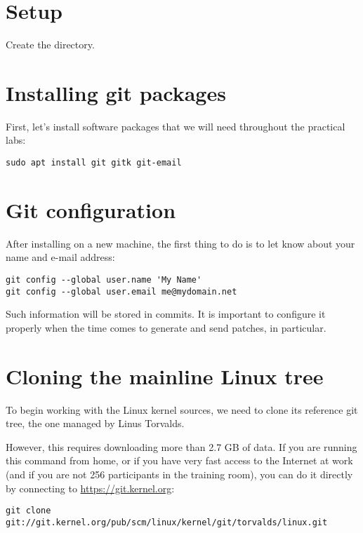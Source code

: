 
\section{Setup}

Create the  directory.

\section{Installing git packages}

First, let's install software packages that we will need
throughout the practical labs:

\begin{verbatim}
sudo apt install git gitk git-email
\end{verbatim}

\section{Git configuration}

After installing  on a new machine, the first thing to do is
to let  know about your name and e-mail address:

\begin{verbatim}
git config --global user.name 'My Name'
git config --global user.email me@mydomain.net
\end{verbatim}

Such information will be stored in commits. It is important
to configure it properly when the time comes to generate and
send patches, in particular.

\section{Cloning the mainline Linux tree}

To begin working with the Linux kernel sources, we need to clone its
reference git tree, the one managed by Linus Torvalds.

However, this requires downloading more than 2.7 GB of data. If you
are running this command from home, or if you have very fast access to
the Internet at work (and if you are not 256 participants in the
training room), you can do it directly by connecting to
\url{https://git.kernel.org}:

{\small
\begin{verbatim}
git clone git://git.kernel.org/pub/scm/linux/kernel/git/torvalds/linux.git
\end{verbatim}
}

